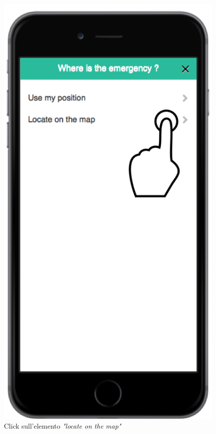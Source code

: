\begin{itemize}
 \begin{figure}[H]
	\centering
	\includegraphics[scale=1]{interfaccia/sceltamap.png}
	\caption{Click sull'elemento \textit{"locate on the map"} }
	\label{fig:sceltamappa}
\end{figure}


\end{itemize}

